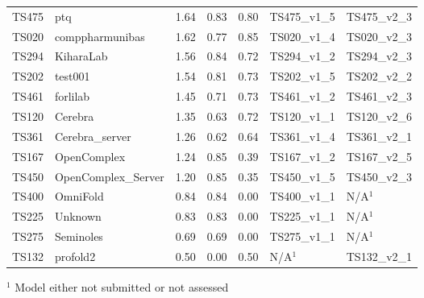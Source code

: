 \begin{table}[ht]
{\begin{tabular}{llrrrll}
TS475 & ptq & 1.64 & 0.83 & 0.80 & TS475\_v1\_5 & TS475\_v2\_3 \\ 
TS020 & comppharmunibas & 1.62 & 0.77 & 0.85 & TS020\_v1\_4 & TS020\_v2\_3 \\ 
TS294 & KiharaLab & 1.56 & 0.84 & 0.72 & TS294\_v1\_2 & TS294\_v2\_3 \\ 
TS202 & test001 & 1.54 & 0.81 & 0.73 & TS202\_v1\_5 & TS202\_v2\_2 \\ 
TS461 & forlilab & 1.45 & 0.71 & 0.73 & TS461\_v1\_2 & TS461\_v2\_3 \\ 
TS120 & Cerebra & 1.35 & 0.63 & 0.72 & TS120\_v1\_1 & TS120\_v2\_6 \\ 
TS361 & Cerebra\_server & 1.26 & 0.62 & 0.64 & TS361\_v1\_4 & TS361\_v2\_1 \\ 
TS167 & OpenComplex & 1.24 & 0.85 & 0.39 & TS167\_v1\_2 & TS167\_v2\_5 \\ 
TS450 & OpenComplex\_Server & 1.20 & 0.85 & 0.35 & TS450\_v1\_5 & TS450\_v2\_3 \\ 
TS400 & OmniFold & 0.84 & 0.84 & 0.00 & TS400\_v1\_1 & N/A$^{1}$ \\ 
TS225 & Unknown & 0.83 & 0.83 & 0.00 & TS225\_v1\_1 & N/A$^{1}$ \\ 
TS275 & Seminoles & 0.69 & 0.69 & 0.00 & TS275\_v1\_1 & N/A$^{1}$ \\ 
TS132 & profold2 & 0.50 & 0.00 & 0.50 & N/A$^{1}$ & TS132\_v2\_1 \\ 
\bottomrule
\end{tabular}%
}
\begin{flushleft}\footnotesize $^{1}$ Model either not submitted or not assessed\end{flushleft}
\end{table}
